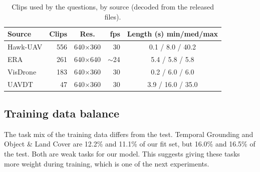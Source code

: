 \begin{table}[t]
\centering
\caption{Clips used by the questions, by source (decoded from the released files).}
\label{tab:clips}
\footnotesize
\begin{tabular}{@{}lrcrc@{}}
\toprule
Source & Clips & Res. & fps & Length (s) min/med/max \\
\midrule
Hawk-UAV & 556 & 640$\times$360 & 30 & 0.1 / 8.0 / 40.2 \\
ERA~\cite{mou2020era} & 261 & 640$\times$640 & $\sim$24 & 5.4 / 5.8 / 5.8 \\
VisDrone~\cite{zhu2021visdrone} & 183 & 640$\times$360 & 30 & 0.2 / 6.0 / 6.0 \\
UAVDT~\cite{du2018uavdt} & 47 & 640$\times$360 & 30 & 3.9 / 16.0 / 35.0 \\
\bottomrule
\end{tabular}
\end{table}

\subsection{Training data balance}
The task mix of the training data differs from the test. Temporal
Grounding and Object \& Land Cover are 12.2\% and 11.1\% of our fit set,
but 16.0\% and 16.5\% of the test. Both are weak tasks for our model. This
suggests giving these tasks more weight during training, which is one of
the next experiments.

